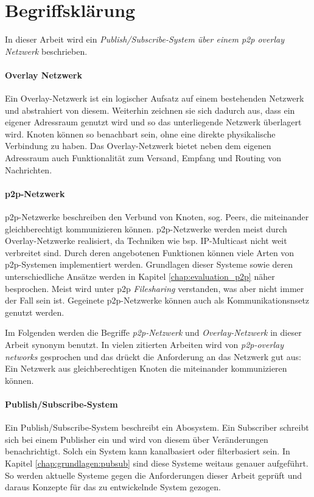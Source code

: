 \section{Begriffsklärung}
In dieser Arbeit wird ein \emph{Publish/Subscribe-System über einem \ac{p2p} overlay Netzwerk} beschrieben.

\paragraph{Overlay Netzwerk} Ein Overlay-Netzwerk ist ein logischer Aufsatz auf einem bestehenden Netzwerk und abstrahiert von diesem. Weiterhin zeichnen sie sich dadurch aus, dass ein eigener Adressraum genutzt wird und so das unterliegende Netzwerk überlagert wird. Knoten können so benachbart sein, ohne eine direkte physikalische Verbindung zu haben. Das Overlay-Netzwerk bietet neben dem eigenen Adressraum auch Funktionalität zum Versand, Empfang und Routing von Nachrichten.


\paragraph{\ac{p2p}-Netzwerk} p2p-Netzwerke beschreiben den Verbund von Knoten, sog. Peers, die miteinander gleichberechtigt kommunizieren können. p2p-Netzwerke werden meist durch Overlay-Netzwerke realisiert, da Techniken wie bsp. IP-Multicast \cite{Deering1990Multicast} nicht weit verbreitet sind. Durch deren angebotenen Funktionen können viele Arten von p2p-Systemen implementiert werden. Grundlagen dieser Systeme sowie deren unterschiedliche Ansätze werden in Kapitel \ref{chap:evaluation_p2p} näher besprochen. Meist wird unter p2p \emph{Filesharing} verstanden, was aber nicht immer der Fall sein ist. Gegeinete p2p-Netzwerke können auch als Kommunikationsnsetz genutzt werden.


Im Folgenden werden die Begriffe \emph{p2p-Netzwerk} und \emph{Overlay-Netzwerk} in dieser Arbeit synonym benutzt. In vielen zitierten Arbeiten wird von \emph{p2p-overlay networks} gesprochen und das drückt die Anforderung an das Netzwerk gut aus: Ein Netzwerk aus gleichberechtigen Knoten die miteinander kommunizieren können.

\paragraph{Publish/Subscribe-System} Ein Publish/Subscribe-System beschreibt ein Abosystem. Ein Subscriber schreibt sich bei einem Publisher ein und wird von diesem über Veränderungen benachrichtigt. Solch ein System kann kanalbasiert oder filterbasiert sein. In Kapitel \ref{chap:grundlagen:pubsub} sind diese Systeme weitaus genauer aufgeführt. So werden aktuelle Systeme gegen die Anforderungen dieser Arbeit geprüft und daraus Konzepte für das zu entwickelnde System gezogen.

